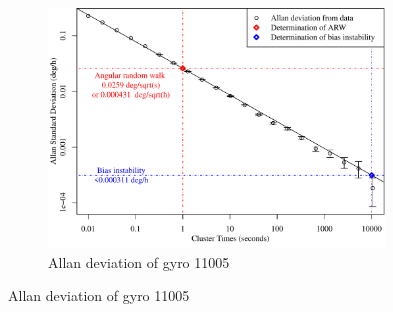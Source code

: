 \begin{figure}[!ht]

	\begin{subfigure}[b]{\textwidth}
		\centering
		\includegraphics[width=0.98\textwidth]{Figures/allandev_11005.pdf} 
		\caption{Allan deviation of gyro 11005}
		\label{subfig:allan11005}
	\end{subfigure}
	

\end{figure}
